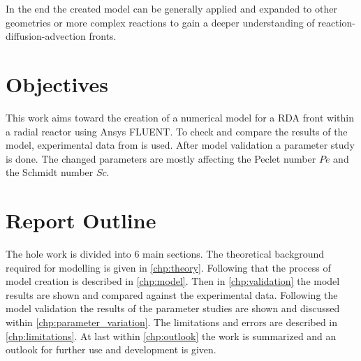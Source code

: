 \documentclass[../thesis.tex]{subfiles}
\begin{document}
In the end the created model can be generally applied and expanded to other geometries or more complex reactions to gain a deeper understanding of reaction-diffusion-advection fronts. 

\section{Objectives}

This work aims toward the creation of a numerical model for a RDA front within a radial reactor using Ansys FLUENT. To check and compare the results of the model, experimental data from \cite{stergiou2022effects} is used. After model validation a parameter study is done. The changed parameters are mostly affecting the Peclet number $Pe$ and the Schmidt number $Sc$.

\section{Report Outline}

The hole work is divided into 6 main sections. The theoretical background required for modelling is given in \autoref{chp:theory}. Following that the process of model creation is described in \autoref{chp:model}. Then in \autoref{chp:validation} the model results are shown and compared against the experimental data. Following the model validation the results of the parameter studies are shown and discussed within \autoref{chp:parameter_variation}. The limitations and errors are described in \autoref{chp:limitations}. At last within \autoref{chp:outlook} the work is summarized and an outlook for further use and development is given.
\end{document}
